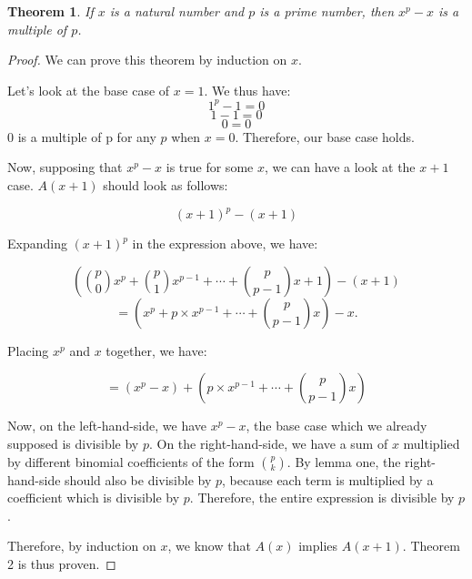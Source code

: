\documentclass[11pt,reqno,oneside,a4paper]{article}
\newtheorem{theorem}{Theorem}
\begin{document}
\begin{theorem} \label{thm:FermatLittle}
	If $x$ is a natural number and $p$ is a prime number, then $x^p - x$ is a multiple of $p$.
\end{theorem}


\begin{proof}
We can prove this theorem by induction on $x$.

Let's look at the base case of $x = 1$. We thus have:
$$1^p - 1 = 0$$
$$1 - 1 = 0$$
$$0 = 0$$
0 is a multiple of p for any $p$ when $x = 0$. Therefore, our base case holds.

Now, supposing that $x^p - x$ is true for some $x$, we can have a look at the $x + 1$ case. $A(x + 1)$ should look as follows:

$$(x + 1)^p - (x+1)$$

Expanding $(x+1)^p$ in the expression above, we have:

$$\left(\binom{p}{0}x^p + \binom{p}{1}x^{p-1} + \cdots + \binom{p}{p-1}x + 1\right) - (x + 1) $$
$$ = \left(x^p + p \times x^{p-1} + \cdots + \binom{p}{p-1}x\right) - x. $$

Placing $x^p$ and $x$ together, we have:

$$ = (x^p - x) + \left(p \times x^{p-1} + \cdots + \binom{p}{p-1}x\right) $$

Now, on the left-hand-side, we have $x^p - x$, the base case which we already supposed is divisible by $p$. On the right-hand-side, we have a sum of $x$ multiplied by different binomial coefficients of the form $\binom{p}{k}$. By lemma one, the right-hand-side should also be divisible by $p$, because each term is multiplied by a coefficient which is divisible by $p$. Therefore, the entire expression is divisible by $p$.

Therefore, by induction on $x$, we know that $A(x)$ implies $A(x+1)$. Theorem 2 is thus proven.

\end{proof}
\end{document}
